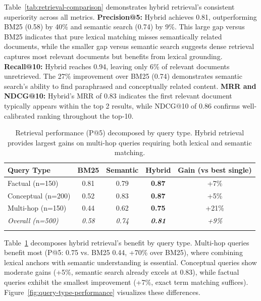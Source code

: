 \documentclass[pdflatex,sn-basic]{sn-jnl}
\begin{document}
Table~\ref{tab:retrieval-comparison} demonstrates hybrid retrieval's consistent superiority across all metrics. \textbf{Precision@5:} Hybrid achieves 0.81, outperforming BM25 (0.58) by 40\% and semantic search (0.74) by 9\%. This large gap versus BM25 indicates that pure lexical matching misses semantically related documents, while the smaller gap versus semantic search suggests dense retrieval captures most relevant documents but benefits from lexical grounding. \textbf{Recall@10:} Hybrid reaches 0.94, leaving only 6\% of relevant documents unretrieved. The 27\% improvement over BM25 (0.74) demonstrates semantic search's ability to find paraphrased and conceptually related content. \textbf{MRR and NDCG@10:} Hybrid's MRR of 0.83 indicates the first relevant document typically appears within the top 2 results, while NDCG@10 of 0.86 confirms well-calibrated ranking throughout the top-10.

\begin{table}[tb]
    \caption{Retrieval performance (P@5) decomposed by query type. Hybrid retrieval provides largest gains on multi-hop queries requiring both lexical and semantic matching.}
    \label{tab:query-type-breakdown}
    \centering
    \small
    \begin{tabular}{lcccc}
        \toprule
        \textbf{Query Type} & \textbf{BM25} & \textbf{Semantic} & \textbf{Hybrid} & \textbf{Gain (vs best single)} \\
        \midrule
        Factual (n=150) & 0.81 & 0.79 & \textbf{0.87} & +7\% \\
        Conceptual (n=200) & 0.52 & 0.83 & \textbf{0.87} & +5\% \\
        Multi-hop (n=150) & 0.44 & 0.62 & \textbf{0.75} & +21\% \\
        \midrule
        \textit{Overall (n=500)} & \textit{0.58} & \textit{0.74} & \textit{\textbf{0.81}} & \textit{+9\%} \\
        \botrule
    \end{tabular}
\end{table}

Table~\ref{tab:query-type-breakdown} decomposes hybrid retrieval's benefit by query type. Multi-hop queries benefit most (P@5: 0.75 vs. BM25 0.44, +70\% over BM25), where combining lexical anchors with semantic understanding is essential. Conceptual queries show moderate gains (+5\%, semantic search already excels at 0.83), while factual queries exhibit the smallest improvement (+7\%, exact term matching suffices). Figure~\ref{fig:query-type-performance} visualizes these differences.
\end{document}
